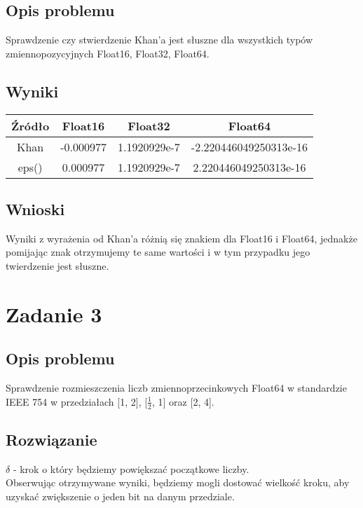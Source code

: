 \documentclass{article}
\begin{document}
\subsection{Opis problemu}
    Sprawdzenie czy stwierdzenie Khan'a jest słuszne dla wszystkich typów zmiennopozycyjnych Float16, Float32, Float64.
\subsection{Wyniki}
    \begin{center}
        \begin{tabular}{|c||c|c|c|}
        \hline
            Źródło & Float16 & Float32 & Float64 \\
            \hline\hline
            Khan & -0.000977 & 1.1920929e-7 & -2.220446049250313e-16\\
            \hline
            eps() & 0.000977 & 1.1920929e-7 & 2.220446049250313e-16\\
        \hline
        \end{tabular}
    \end{center}
\subsection{Wnioski}
    Wyniki z wyrażenia od Khan'a różnią się znakiem dla Float16 i Float64, jednakże pomijając znak otrzymujemy te same wartości i w tym przypadku jego twierdzenie jest słuszne.

\section{Zadanie 3}
\subsection{Opis problemu}
	Sprawdzenie rozmieszczenia liczb zmiennoprzecinkowych Float64 w standardzie IEEE 754 w przedziałach [1, 2], [$\frac{1}{2}$, 1] oraz [2, 4].
\subsection{Rozwiązanie}
	$\delta$ - krok o który będziemy powiększać początkowe liczby.\\
    Obserwując otrzymywane wyniki, będziemy mogli dostować wielkość kroku, aby uzyskać zwiększenie o jeden bit na danym przedziale.
\end{document}
